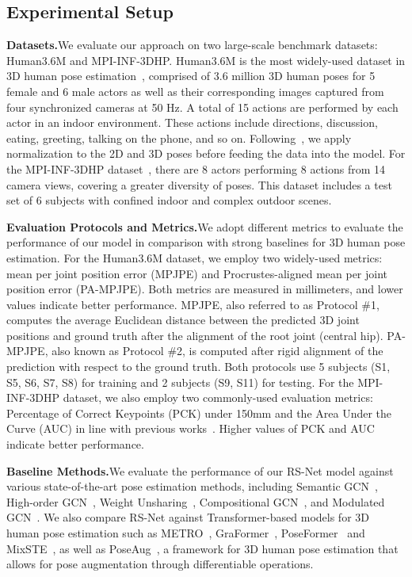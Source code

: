 \documentclass[10pt,journal]{IEEEtran}
\begin{document}
\subsection{Experimental Setup}
\noindent\textbf{Datasets.}\quad We evaluate our approach on two large-scale benchmark datasets: Human3.6M and MPI-INF-3DHP. Human3.6M is the most widely-used dataset in 3D human pose estimation~\cite{ionescu2013human3}, comprised of 3.6 million 3D human poses for 5 female and 6 male actors as well as their corresponding images captured from four synchronized cameras at 50 Hz. A total of 15 actions are performed by each actor in an indoor environment. These actions include directions, discussion, eating, greeting, talking on the phone, and so on. Following~\cite{zou2020high, martinez2017simple}, we apply normalization to the 2D and 3D poses before feeding the data into the model. For the MPI-INF-3DHP dataset~\cite{Dushyant:2017}, there are 8 actors performing 8 actions from 14 camera views, covering a greater diversity of poses. This dataset includes a test set of 6 subjects with confined indoor and complex outdoor scenes.
	
\medskip\noindent\textbf{Evaluation Protocols and Metrics.}\quad We adopt different metrics to evaluate the performance of our model in comparison with strong baselines for 3D human pose estimation. For the Human3.6M dataset, we employ two widely-used metrics: mean per joint position error (MPJPE) and Procrustes-aligned
mean per joint position error (PA-MPJPE). Both metrics are measured in millimeters, and lower values indicate better performance. MPJPE, also referred to as Protocol \#1, computes the average Euclidean distance between the predicted 3D joint positions and ground truth after the alignment of the root joint (central hip). PA-MPJPE, also known as Protocol \#2, is computed after rigid alignment of the prediction with respect to the ground truth. Both protocols use 5 subjects (S1, S5, S6, S7, S8) for training and 2 subjects (S9, S11) for testing. For the MPI-INF-3DHP dataset, we also employ two commonly-used evaluation metrics: Percentage of Correct Keypoints (PCK) under 150mm and the Area Under the Curve (AUC) in line with previous works~\cite{quan2021higher,zou2021compositional,yang20183d,pavlakos2018ordinal,Habibie:19,li2019generating}. Higher values of PCK and AUC indicate better performance.

\medskip\noindent\textbf{Baseline Methods.}\quad We evaluate the performance of our RS-Net model against various state-of-the-art pose estimation methods, including Semantic GCN~\cite{zhao2019semantic}, High-order GCN~\cite{zou2020high}, Weight Unsharing~\cite{liu2020comprehensive}, Compositional GCN~\cite{zou2021compositional}, and Modulated GCN~\cite{zou2021modulated}. We also compare RS-Net against Transformer-based models for 3D human pose estimation such as METRO~\cite{Kevin2021End}, GraFormer~\cite{Weixi2021GraFormer}, PoseFormer~\cite{PoseFormer:2021} and MixSTE~\cite{Jinlu2022Mix}, as well as PoseAug~\cite{Kehong2021PoseAug}, a framework for 3D human pose estimation that allows for pose augmentation through differentiable operations.
	
\end{document}
